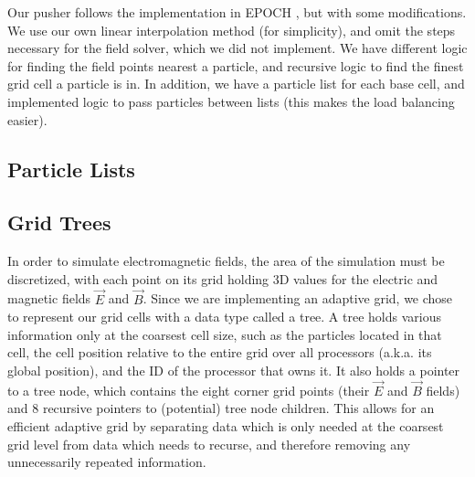\documentclass[]{article}
\begin{document}
\begin{figure}[htbp]
\label{fig:boris}
\end{figure}

Our pusher follows the implementation in EPOCH \cite{epoch}, but with some modifications.  We use our own linear interpolation method (for simplicity), and omit the steps necessary for the field solver, which we did not implement.  We have different logic for finding the field points nearest a particle, and recursive logic to find the finest grid cell a particle is in.  In addition, we have a particle list for each base cell, and implemented logic to pass particles between lists (this makes the load balancing easier).

\subsection{Particle Lists}

\subsection{Grid Trees}
In order to simulate electromagnetic fields, the area of the simulation must be discretized, with each point on its grid holding 3D values for the electric and magnetic fields $\vec{E}$ and $\vec{B}$. Since we are implementing an adaptive grid, we chose to represent our grid cells with a data type called a tree. A tree holds various information only at the coarsest cell size, such as the particles located in that cell, the cell position relative to the entire grid over all processors (a.k.a. its global position), and the ID of the processor that owns it. It also holds a pointer to a tree node, which contains the eight corner grid points (their $\vec{E}$ and $\vec{B}$ fields) and 8 recursive pointers to (potential) tree node children. This allows for an efficient adaptive grid by separating data which is only needed at the coarsest grid level from data which needs to recurse, and therefore removing any unnecessarily repeated information.
\end{document}
